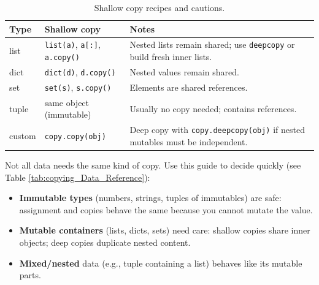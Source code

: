 

\renewcommand{\arraystretch}{1.15}
\begin{table}[h]
\centering
\begin{tabularx}{\textwidth}{|l|X|X|}
\hline
\textbf{Type} & \textbf{Shallow copy} & \textbf{Notes} \\ \hline
list & \texttt{list(a)}, \texttt{a[:]}, \texttt{a.copy()} & Nested lists remain shared; use \texttt{deepcopy} or build fresh inner lists. \\ \hline
dict & \texttt{dict(d)}, \texttt{d.copy()} & Nested values remain shared. \\ \hline
set & \texttt{set(s)}, \texttt{s.copy()} & Elements are shared references. \\ \hline
tuple & same object (immutable) & Usually no copy needed; contains references. \\ \hline
custom & \texttt{copy.copy(obj)} & Deep copy with \texttt{copy.deepcopy(obj)} if nested mutables must be independent. \\ \hline
\end{tabularx}
\caption{Shallow copy recipes and cautions.}
\end{table}


Not all data needs the same kind of copy. Use this guide to decide quickly (see Table \ref{tab:copying_Data_Reference}):
\begin{itemize}
  \item \textbf{Immutable types} (numbers, strings, tuples of immutables) are safe: assignment and copies behave the same because you cannot mutate the value.
  \item \textbf{Mutable containers} (lists, dicts, sets) need care: shallow copies share inner objects; deep copies duplicate nested content.
  \item \textbf{Mixed/nested} data (e.g., tuple containing a list) behaves like its mutable parts.
\end{itemize}

